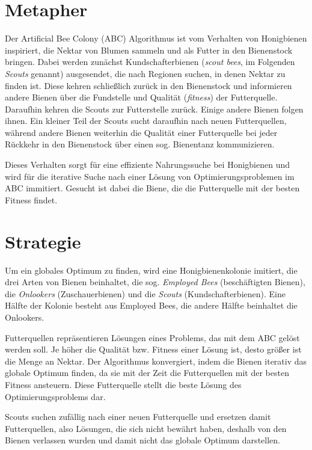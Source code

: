 
\section{Metapher}

Der Artificial Bee Colony (ABC) Algorithmus ist vom Verhalten von Honigbienen
inspiriert, die Nektar von Blumen sammeln und als Futter in den Bienenstock
bringen. Dabei werden zunächst Kundschafterbienen (\emph{scout bees}, im Folgenden
\emph{Scouts} genannt) ausgesendet, die nach Regionen suchen, in denen Nektar
zu finden ist. Diese kehren schließlich zurück in den Bienenstock und
informieren andere Bienen über die Fundstelle und Qualität (\emph{fitness})
der Futterquelle.
Daraufhin kehren die Scouts zur Futterstelle zurück. Einige andere Bienen
folgen ihnen. Ein kleiner Teil der Scouts sucht daraufhin nach neuen
Futterquellen, während andere Bienen weiterhin die Qualität einer
Futterquelle bei jeder Rückkehr in den Bienenstock über einen sog. Bienentanz
kommunizieren.

Dieses Verhalten sorgt für eine effiziente Nahrungssuche bei Honigbienen und
wird für die iterative Suche nach einer Lösung von Optimierungsproblemen im
ABC immitiert. Gesucht ist dabei die Biene, die die Futterquelle mit der besten
Fitness findet.

\section{Strategie}

Um ein globales Optimum zu finden, wird eine Honigbienenkolonie imitiert, die
drei Arten von Bienen beinhaltet, die sog. \emph{Employed Bees} (beschäftigten
Bienen), die \emph{Onlookers} (Zuschauerbienen) und die \emph{Scouts}
(Kundschafterbienen). Eine Hälfte der Kolonie besteht aus Employed Bees, die
andere Hälfte beinhaltet die Onlookers.

Futterquellen repräsentieren Lösungen eines Problems, das mit dem ABC
gelöst werden soll. Je höher die Qualität bzw. Fitness einer Lösung ist, desto
größer ist die Menge an Nektar. Der Algorithmus konvergiert, indem die Bienen
iterativ das globale Optimum finden, da sie mit der Zeit die Futterquellen mit
der besten Fitness ansteuern. Diese Futterquelle stellt die beste Lösung des
Optimierungsproblems dar.

Scouts suchen zufällig nach einer neuen Futterquelle und ersetzen damit
Futterquellen, also Lösungen, die sich nicht bewährt haben, deshalb von den
Bienen verlassen wurden und damit nicht das globale Optimum darstellen.

